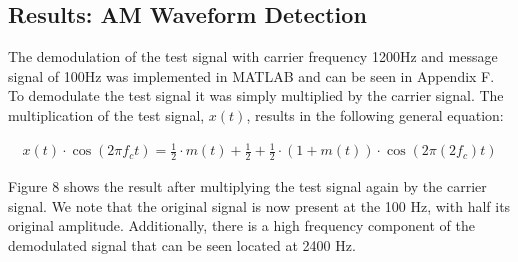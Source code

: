 \documentclass{article}
\begin{document}
\subsection{Results: AM Waveform Detection}
The demodulation of the test signal with carrier frequency 1200$\si{\hertz}$ and message signal of 100$\si{\hertz}$ was implemented in MATLAB and can be seen in Appendix F. To demodulate the test signal it was simply multiplied by the carrier signal. The multiplication of the test signal, $x(t)$, results in the following general equation:

\begin{align}
	x(t) \cdot \cos (2 \pi f_c t) = \frac{1}{2} \cdot m(t) + \frac{1}{2} + \frac{1}{2} \cdot (1 + m(t)) \cdot \cos (2 \pi (2 f_c) t)
\end{align}

Figure 8 shows the result after multiplying the test signal again by the carrier signal. We note that the original signal is now present at the 100 $\si{\hertz}$, with half its original amplitude. Additionally, there is a high frequency component of the demodulated signal that can be seen located at 2400 $\si{\hertz}$.
\end{document}
